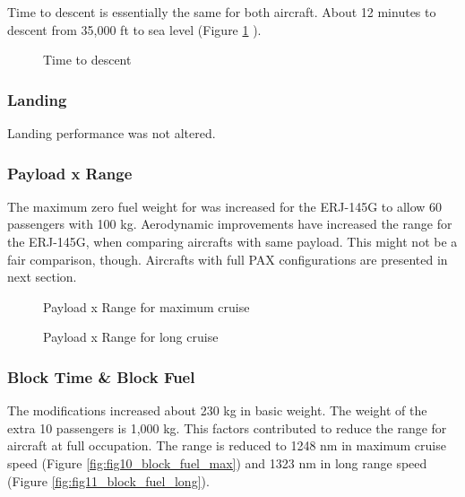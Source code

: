 Time to descent is essentially the same for both aircraft. About 12 minutes to descent from 35,000 ft to sea level (Figure \ref{fig:fig7_time2descent} ).

\begin{figure}[H] %
\caption{Time to descent}
\label{fig:fig7_time2descent}
\end{figure}

\subsubsection{Landing}

Landing performance was not altered.

\subsubsection{Payload x Range}

The maximum zero fuel weight for was increased for the ERJ-145G to allow 60 passengers with 100 kg. Aerodynamic improvements have increased the range for the ERJ-145G, when comparing aircrafts with same payload. This might not be a fair comparison, though. Aircrafts with full PAX configurations are presented in next section.

\begin{figure}[H] %
\caption{Payload x Range for maximum cruise}
\label{fig:fig8_payload_range_max}
\end{figure}

\begin{figure}[H] %
\caption{Payload x Range for long cruise}
\label{fig:fig9_payload_range_long}
\end{figure}

\subsubsection{Block Time \& Block Fuel}

The modifications increased about 230 kg in basic weight. The weight of the extra 10 passengers is 1,000 kg. This factors contributed to reduce the range for aircraft at full occupation. The range is reduced to 1248 nm in maximum cruise speed (Figure \ref{fig:fig10_block_fuel_max}) and 1323 nm in long range speed (Figure \ref{fig:fig11_block_fuel_long}).

